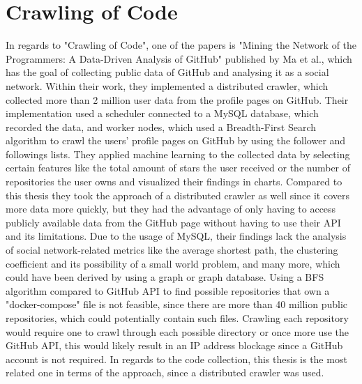\section{Crawling of Code}
\label{sec:coc}
In regards to "Crawling of Code", one of the papers is "Mining the Network of the Programmers: A Data-Driven Analysis of GitHub" \cite{mining} published by Ma et al., which has the goal of collecting public data of GitHub and analysing it as a social network. Within their work, they implemented a distributed crawler, which collected more than 2 million user data from the profile pages on GitHub. Their implementation used a scheduler connected to a MySQL database, which recorded the data, and worker nodes, which used a Breadth-First Search algorithm to crawl the users' profile pages on GitHub by using the follower and followings lists. They applied machine learning to the collected data by selecting certain features like the total amount of stars the user received or the number of repositories the user owns and visualized their findings in charts.
Compared to this thesis they took the approach of a distributed crawler as well since it covers more data more quickly, but they had the advantage of only having to access publicly available data from the GitHub page without having to use their API and its limitations. Due to the usage of MySQL, their findings lack the analysis of social network-related metrics like the average shortest path, the clustering coefficient and its possibility of a small world problem, and many more, which could have been derived by using a graph or graph database. Using a BFS algorithm compared to GitHub API to find possible repositories that own a "docker-compose" file is not feasible, since there are more than 40 million public repositories\cite{githubpublicrepos}, which could potentially contain such files. Crawling each repository would require one to crawl through each possible directory or once more use the GitHub API, this would likely result in an IP address blockage since a GitHub account is not required. In regards to the code collection, this thesis is the most related one in terms of the approach, since a distributed crawler was used.

